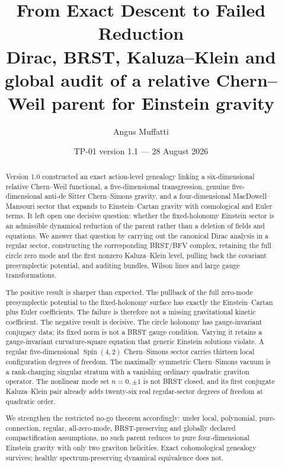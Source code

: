 \documentclass[11pt,a4paper]{article}
\title{\textbf{From Exact Descent to Failed Reduction}\\
\large Dirac, BRST, Kaluza--Klein and global audit of a relative Chern--Weil parent for Einstein gravity}
\author{Angus Muffatti}
\date{TP-01 version 1.1 --- 28 August 2026}
\theoremstyle{definition}
\theoremstyle{remark}
\newcommand{\Spin}{\operatorname{Spin}}
\begin{document}
\maketitle

\begin{abstract}
Version 1.0 constructed an exact action-level genealogy linking a six-dimensional relative Chern--Weil functional, a five-dimensional transgression, genuine five-dimensional anti-de Sitter Chern--Simons gravity, and a four-dimensional MacDowell--Mansouri sector that expands to Einstein--Cartan gravity with cosmological and Euler terms.  It left open one decisive question: whether the fixed-holonomy Einstein sector is an admissible dynamical reduction of the parent rather than a deletion of fields and equations.  We answer that question by carrying out the canonical Dirac analysis in a regular sector, constructing the corresponding BRST/BFV complex, retaining the full circle zero mode and the first nonzero Kaluza--Klein level, pulling back the covariant presymplectic potential, and auditing bundles, Wilson lines and large gauge transformations.

The positive result is sharper than expected.  The pullback of the full zero-mode presymplectic potential to the fixed-holonomy surface has exactly the Einstein--Cartan plus Euler coefficients.  The failure is therefore not a missing gravitational kinetic coefficient.  The negative result is decisive.  The circle holonomy has gauge-invariant conjugacy data; its fixed norm is not a BRST gauge condition.  Varying it retains a gauge-invariant curvature-square equation that generic Einstein solutions violate.  A regular five-dimensional $\Spin(4,2)$ Chern--Simons sector carries thirteen local configuration degrees of freedom.  The maximally symmetric Chern--Simons vacuum is a rank-changing singular stratum with a vanishing ordinary quadratic graviton operator.  The nonlinear mode set $n=0,\pm1$ is not BRST closed, and its first conjugate Kaluza--Klein pair already adds twenty-six real regular-sector degrees of freedom at quadratic order.

We strengthen the restricted no-go theorem accordingly: under local, polynomial, pure-connection, regular, all-zero-mode, BRST-preserving and globally declared compactification assumptions, no such parent reduces to pure four-dimensional Einstein gravity with only two graviton helicities.  Exact cohomological genealogy survives; healthy spectrum-preserving dynamical equivalence does not.
\end{abstract}
\end{document}
